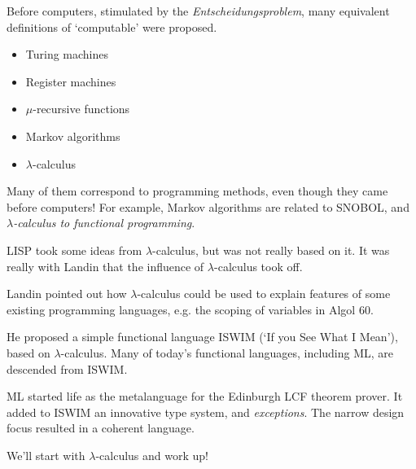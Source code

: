 \begin{slide*}


\vspace*{0.5cm}

Before computers, stimulated by the {\em Entscheidungsproblem}, many equivalent
definitions of `computable' were proposed.

\begin{itemize}

\item Turing machines

\item Register machines

\item $\mu$-recursive functions

\item Markov algorithms

\item \begin{red} $\lambda$-calculus \end{red}

\end{itemize}

Many of them correspond to programming methods, even though they came before
computers! For example, Markov algorithms are related to SNOBOL, and {\em
$\lambda$-calculus to functional programming}.

\end{slide*}



\begin{slide*}


\vspace*{0.5cm}

LISP took some ideas from $\lambda$-calculus, but was not really based on it.
It was really with Landin that the influence of $\lambda$-calculus took off.

Landin pointed out how $\lambda$-calculus could be used to explain features of
some existing programming languages, e.g. the scoping of variables in Algol 60.

He proposed a simple functional language ISWIM (`If you See What I Mean'),
based on $\lambda$-calculus. Many of today's functional languages, including
ML, are descended from ISWIM.

ML started life as the metalanguage for the Edinburgh LCF theorem prover. It
added to ISWIM an innovative type system, and {\em exceptions}. The narrow
design focus resulted in a coherent language.

We'll start with $\lambda$-calculus and work up!

\end{slide*}



